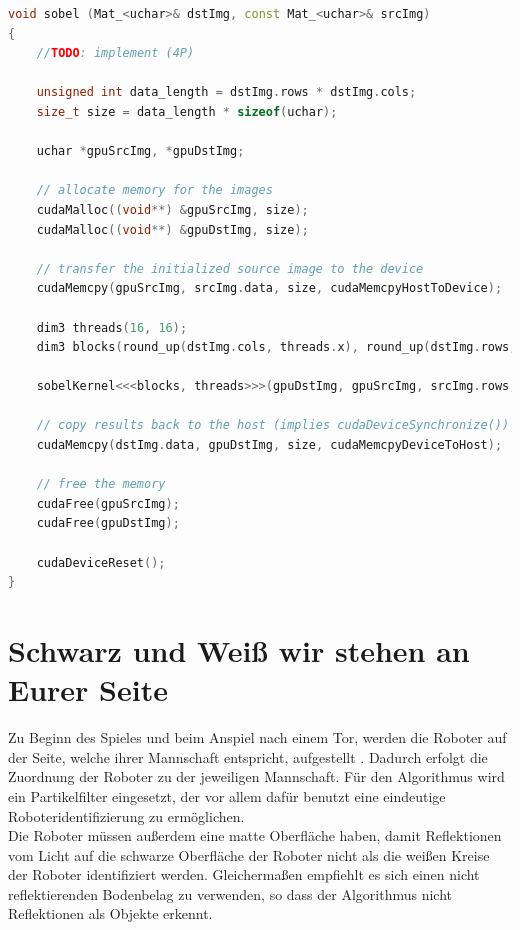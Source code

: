 \documentclass{ezb}
\begin{document}
\begin{lstlisting}[language=C++]
void sobel (Mat_<uchar>& dstImg, const Mat_<uchar>& srcImg)
{
    //TODO: implement (4P)
	
	unsigned int data_length = dstImg.rows * dstImg.cols;
	size_t size = data_length * sizeof(uchar);
	
	uchar *gpuSrcImg, *gpuDstImg;
	
	// allocate memory for the images
	cudaMalloc((void**) &gpuSrcImg, size);
	cudaMalloc((void**) &gpuDstImg, size);
	
	// transfer the initialized source image to the device
	cudaMemcpy(gpuSrcImg, srcImg.data, size, cudaMemcpyHostToDevice);
	
	dim3 threads(16, 16);
	dim3 blocks(round_up(dstImg.cols, threads.x), round_up(dstImg.rows, threads.y));
	
	sobelKernel<<<blocks, threads>>>(gpuDstImg, gpuSrcImg, srcImg.rows, srcImg.cols);
	
	// copy results back to the host (implies cudaDeviceSynchronize())
	cudaMemcpy(dstImg.data, gpuDstImg, size, cudaMemcpyDeviceToHost);
	
	// free the memory
	cudaFree(gpuSrcImg);
	cudaFree(gpuDstImg);
	
	cudaDeviceReset();
}

\end{lstlisting}
\section{Schwarz und Weiß wir stehen an Eurer Seite}
Zu Beginn des Spieles und beim Anspiel nach einem Tor, werden die Roboter auf der Seite, welche ihrer Mannschaft entspricht, aufgestellt . Dadurch erfolgt die Zuordnung der Roboter zu der jeweiligen Mannschaft. Für den Algorithmus wird ein Partikelfilter eingesetzt, der vor allem dafür benutzt eine eindeutige Roboteridentifizierung zu ermöglichen.\\
\linebreak
Die Roboter müssen außerdem eine matte Oberfläche haben, damit Reflektionen vom Licht auf die schwarze Oberfläche der Roboter nicht als die weißen Kreise der Roboter identifiziert werden. Gleichermaßen empfiehlt es sich einen nicht reflektierenden Bodenbelag zu verwenden, so dass der Algorithmus nicht Reflektionen als Objekte erkennt.
\end{document}
